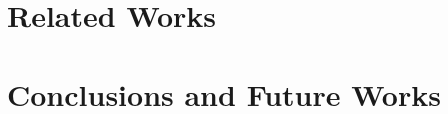 \section{Related Works}\label{sec:related}

\section{Conclusions and Future Works}\label{sec:conclusions}

